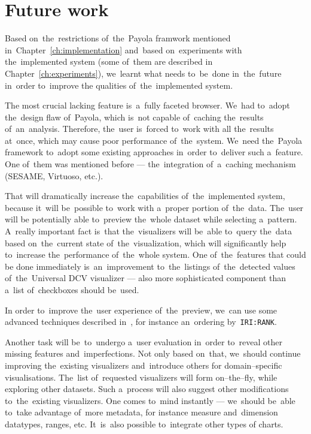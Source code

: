 \chapter{Future work}
\label{ch:future}

\begin{sloppypar}
Based on~the~restrictions of~the~Payola framwork mentioned in~Chapter~\ref{ch:implementation}
and~based on~experiments with the~implemented system (some of~them are described in
Chapter~\ref{ch:experiments}), we~learnt what needs to~be~done in~the~future in~order to~improve
the qualities of~the~implemented system.
\end{sloppypar}

The most crucial lacking feature is~a~fully faceted browser. We~had to~adopt the~design flaw of~Payola, which is~not capable of~caching the~results of~an~analysis. 
Therefore, the~user is~forced to~work with all the~results at~once, which may 
cause poor performance of~the~system. We~need the~Payola framework to~adopt some 
existing approaches in~order to~deliver such a~feature. One of~them was 
mentioned before --- the~integration of~a~caching mechanism (SESAME, Virtuoso, etc.).

That will dramatically increase the~capabilities of~the~implemented system, 
because it~will be~possible to~work with a~proper portion of~the~data. The~user will 
be potentially able to~preview the~whole dataset while selecting a~pattern. A~really important fact is~that the~visualizers will be~able to~query the~data 
based on~the~current state of~the~visualization, which will significantly help 
to~increase the~performance of~the~whole system. One of~the~features that could 
be done immediately is~an~improvement to~the~listings of~the~detected values of~the~Universal DCV visualizer --- also more sophisticated component than a~list of~checkboxes should be~used.

In order to~improve the~user experience of~the~preview, we~can use some advanced 
techniques described in~\cite{faceted-ldow2009}, for instance an~ordering by~\texttt{IRI:RANK}.

Another task will be~to~undergo a~user evaluation in~order to~reveal other 
missing features and~imperfections. Not only based on~that, we~should continue 
improving the~existing visualizers and~introduce others for
domain--specific visualisations. The~list of~requested visualizers will form 
on--the--fly, while exploring other datasets. Such a~process will also suggest 
other modifications to~the~existing visualizers. One comes to~mind instantly --- we~should be~able to~take advantage of~more metadata, for instance measure and~dimension datatypes, ranges, etc. It~is~also possible to~integrate other types 
of charts.

